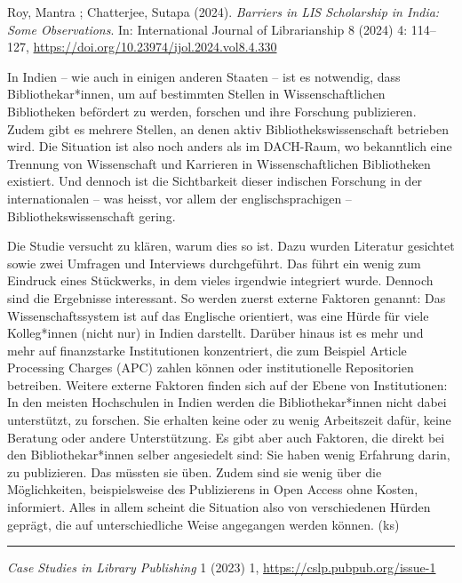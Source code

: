 \documentclass[a4paper,
fontsize=11pt,
oneside,
numbers=noperiodatend,
parskip=half-,
bibliography=totoc,
final
]{scrartcl}
\begin{document}
Roy, Mantra ; Chatterjee, Sutapa (2024). \emph{Barriers in LIS
Scholarship in India: Some Observations}. In: International Journal of
Librarianship 8 (2024) 4: 114--127,
\url{https://doi.org/10.23974/ijol.2024.vol8.4.330}

In Indien -- wie auch in einigen anderen Staaten -- ist es notwendig,
dass Bibliothekar*innen, um auf bestimmten Stellen in Wissenschaftlichen
Bibliotheken befördert zu werden, forschen und ihre Forschung
publizieren. Zudem gibt es mehrere Stellen, an denen aktiv
Bibliothekswissenschaft betrieben wird. Die Situation ist also noch
anders als im DACH-Raum, wo bekanntlich eine Trennung von Wissenschaft
und Karrieren in Wissenschaftlichen Bibliotheken existiert. Und dennoch
ist die Sichtbarkeit dieser indischen Forschung in der internationalen
-- was heisst, vor allem der englischsprachigen --
Bibliothekswissenschaft gering.

Die Studie versucht zu klären, warum dies so ist. Dazu wurden Literatur
gesichtet sowie zwei Umfragen und Interviews durchgeführt. Das führt ein
wenig zum Eindruck eines Stückwerks, in dem vieles irgendwie integriert
wurde. Dennoch sind die Ergebnisse interessant. So werden zuerst externe
Faktoren genannt: Das Wissenschaftssystem ist auf das Englische
orientiert, was eine Hürde für viele Kolleg*innen (nicht nur) in Indien
darstellt. Darüber hinaus ist es mehr und mehr auf finanzstarke
Institutionen konzentriert, die zum Beispiel Article Processing Charges
(APC) zahlen können oder institutionelle Repositorien betreiben. Weitere
externe Faktoren finden sich auf der Ebene von Institutionen: In den
meisten Hochschulen in Indien werden die Bibliothekar*innen nicht dabei
unterstützt, zu forschen. Sie erhalten keine oder zu wenig Arbeitszeit
dafür, keine Beratung oder andere Unterstützung. Es gibt aber auch
Faktoren, die direkt bei den Bibliothekar*innen selber angesiedelt sind:
Sie haben wenig Erfahrung darin, zu publizieren. Das müssten sie üben.
Zudem sind sie wenig über die Möglichkeiten, beispielsweise des
Publizierens in Open Access ohne Kosten, informiert. Alles in allem
scheint die Situation also von verschiedenen Hürden geprägt, die auf
unterschiedliche Weise angegangen werden können. (ks)

\begin{center}\rule{0.5\linewidth}{0.5pt}\end{center}

\emph{Case Studies in Library Publishing} 1 (2023) 1,
\url{https://cslp.pubpub.org/issue-1}
\end{document}
